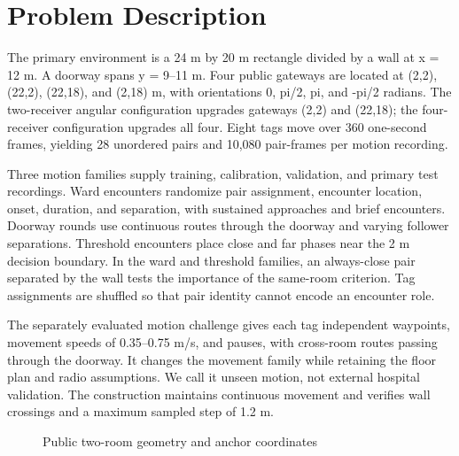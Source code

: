 \documentclass[12pt,a4paper]{report}
\begin{document}
\section{Problem Description}
The primary environment is a 24 m by 20 m rectangle divided by a wall at x = 12 m. A doorway spans y = 9--11 m. Four public gateways are located at (2,2), (22,2), (22,18), and (2,18) m, with orientations 0, pi/2, pi, and -pi/2 radians. The two-receiver angular configuration upgrades gateways (2,2) and (22,18); the four-receiver configuration upgrades all four. Eight tags move over 360 one-second frames, yielding 28 unordered pairs and 10,080 pair-frames per motion recording.

Three motion families supply training, calibration, validation, and primary test recordings. Ward encounters randomize pair assignment, encounter location, onset, duration, and separation, with sustained approaches and brief encounters. Doorway rounds use continuous routes through the doorway and varying follower separations. Threshold encounters place close and far phases near the 2 m decision boundary. In the ward and threshold families, an always-close pair separated by the wall tests the importance of the same-room criterion. Tag assignments are shuffled so that pair identity cannot encode an encounter role.

The separately evaluated motion challenge gives each tag independent waypoints, movement speeds of 0.35--0.75 m/s, and pauses, with cross-room routes passing through the doorway. It changes the movement family while retaining the floor plan and radio assumptions. We call it unseen motion, not external hospital validation. The construction maintains continuous movement and verifies wall crossings and a maximum sampled step of 1.2 m.


\begin{figure}[htbp]
\centering
{}
\caption{Public two-room geometry and anchor coordinates}\label{fig:floorplan}
\end{figure}
\end{document}
